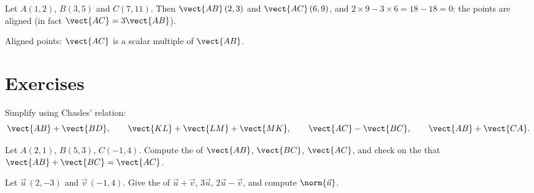 \begin{example}\label{ex:g10:vectors:alignment}
Let $A(1, 2)$, $B(3, 5)$ and $C(7, 11)$. Then $\vect{AB}\,(2, 3)$ and
$\vect{AC}\,(6, 9)$, and $2 \times 9 - 3 \times 6 = 18 - 18 = 0$: the
points are aligned (in fact $\vect{AC} = 3\vect{AB}$).
\end{example}

\begin{omfigure}

{\small Aligned points: $\vect{AC}$ is a scalar multiple of $\vect{AB}$.}
\end{omfigure}

\section{Exercises}

\begin{exercise}[$\star$]\label{exo:g10:vectors:1}
Simplify using Chasles' relation:
\[
\vect{AB} + \vect{BD}, \qquad
\vect{KL} + \vect{LM} + \vect{MK}, \qquad
\vect{AC} - \vect{BC}, \qquad
\vect{AB} + \vect{CA}.
\]
\end{exercise}

\begin{exercise}[$\star$]\label{exo:g10:vectors:2}
Let $A(2, 1)$, $B(5, 3)$, $C(-1, 4)$. Compute the  of
$\vect{AB}$, $\vect{BC}$, $\vect{AC}$, and check on the  that
$\vect{AB} + \vect{BC} = \vect{AC}$.
\end{exercise}

\begin{exercise}[$\star$]\label{exo:g10:vectors:3}
Let $\vec u\,(2, -3)$ and $\vec v\,(-1, 4)$. Give the  of
$\vec u + \vec v$, $3\vec u$, $2\vec u - \vec v$, and compute
$\norm{\vec u}$.
\end{exercise}

